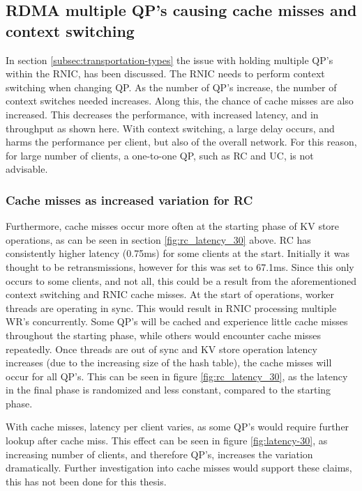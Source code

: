 \subsection{RDMA multiple QP's causing cache misses and context switching}\label{subsec:rdma-multiple-qp's-causing-cache-misses-and-context-switching}
In section \ref{subsec:transportation-types} the issue with holding multiple QP's within the RNIC, has been discussed.
The RNIC needs to perform context switching when changing QP.
As the number of QP's increase, the number of context switches needed increases.
Along this, the chance of cache misses are also increased.
This decreases the performance, with increased latency, and in throughput as shown here.
With context switching, a large delay occurs, and harms the performance per client, but also of the overall network.
For this reason, for large number of clients, a one-to-one QP, such as RC and UC, is not advisable.

\subsubsection{Cache misses as increased variation for RC}
Furthermore, cache misses occur more often at the starting phase of KV store operations, as can be seen in section \ref{fig:rc_latency_30} above.
RC has consistently higher latency (0.75ms) for some clients at the start.
Initially it was thought to be retransmissions, however for this was set to 67.1ms.
Since this only occurs to some clients, and not all, this could be a result from the aforementioned context switching and RNIC cache misses.
At the start of operations, worker threads are operating in sync.
This would result in RNIC processing multiple WR's concurrently.
Some QP's will be cached and experience little cache misses throughout the starting phase, while others would encounter cache misses repeatedly.
Once threads are out of sync and KV store operation latency increases (due to the increasing size of the hash table), the cache misses will occur for all QP's.
This can be seen in figure \ref{fig:rc_latency_30}, as the latency in the final phase is randomized and less constant, compared to the starting phase.

With cache misses, latency per client varies, as some QP's would require further lookup after cache miss.
This effect can be seen in figure \ref{fig:latency-30}, as increasing number of clients, and therefore QP's, increases the variation dramatically.
Further investigation into cache misses would support these claims, this has not been done for this thesis.

